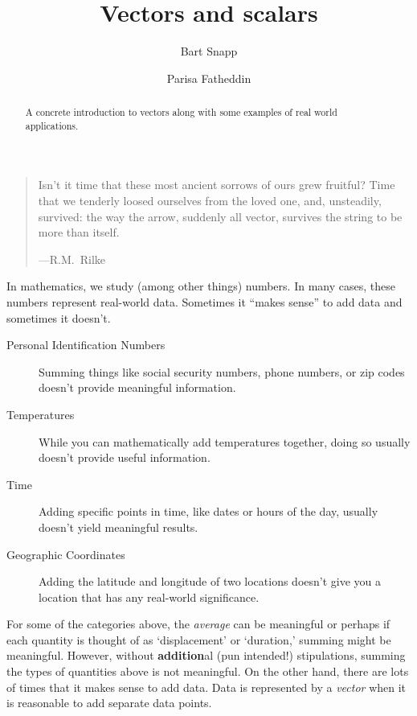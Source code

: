 \documentclass{ximera}
\author{Bart Snapp \and Parisa Fatheddin}
\title{Vectors and scalars}
\begin{document}
\begin{abstract}
  A concrete introduction to vectors along with some examples of real world applications.
\end{abstract}
\maketitle


\begin{quote}
  Isn’t it time that these most ancient sorrows of ours grew fruitful?
  Time that we tenderly loosed ourselves from the loved one, and,
  unsteadily, survived: the way the arrow, suddenly all vector,
  survives the string to be more than itself.



  \hfill ---R.M.\ Rilke
\end{quote}


In mathematics, we study (among other things) numbers. In many cases,
these numbers represent real-world data. Sometimes it ``makes sense''
to add data and sometimes it doesn't.
\begin{concept}
\begin{description}
\item[Personal Identification Numbers] Summing things like social
  security numbers, phone numbers, or zip codes doesn't provide
  meaningful information.
\item[Temperatures] While you can mathematically add temperatures
  together, doing so usually doesn't provide useful information.
\item[Time] Adding specific points in time, like dates or hours of the
  day, usually doesn't yield meaningful results.
\item[Geographic Coordinates] Adding the latitude and longitude of two
  locations doesn't give you a location that has any real-world
  significance.
\end{description}
\end{concept}
For some of the categories above, the \textit{average} can be
meaningful or perhaps if each quantity is thought of as `displacement'
or `duration,' summing might be meaningful. However, without
\textbf{addition}al (pun intended!) stipulations, summing the types of
quantities above is not meaningful. On the other hand, there are lots
of times that it makes sense to add data. Data is represented by a
\textit{vector} when it is reasonable to add separate data points.
\end{document}
